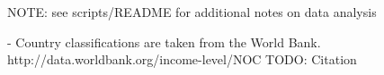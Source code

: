 NOTE: see scripts/README for additional notes on data analysis

- Country classifications are taken from the World
Bank. http://data.worldbank.org/income-level/NOC
TODO: Citation




